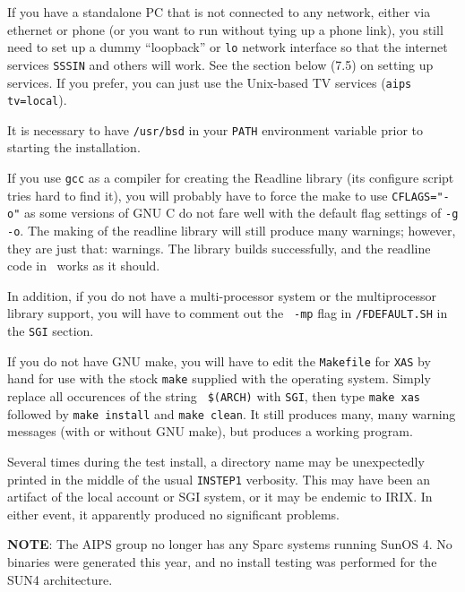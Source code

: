 If you have a standalone PC that is not connected to any network, either
via ethernet or phone (or you want to run without tying up a phone
link), you still need to set up a dummy ``loopback'' or {\tt lo} network
interface so that the internet services {\tt SSSIN} and others will
work.  See the section below
(7.5) on setting up services.  If you prefer, you can just use the
Unix-based TV services ({\tt aips tv=local}).

\medskip{}

It is necessary to have {\tt /usr/bsd} in your {\tt PATH} environment
variable prior to starting the installation.

If you use {\tt gcc} as a compiler for creating the Readline library
(its configure script tries hard to find it), you will probably have to
force the make to use {\tt CFLAGS="-o"} as some versions of GNU C do not
fare well with the default flag settings of {\tt -g -o}.  The making of
the readline library will still produce many warnings; however, they are
just that: warnings.  The library builds successfully, and the readline
code in \ttaips\ works as it should.

In addition, if you do not have a multi-processor system or the
multiprocessor library support, you will have to comment out the {\tt
-mp} flag in {\tt\SYSU /FDEFAULT.SH} in the {\tt SGI} section.

If you do not have GNU make, you will have to edit the {\tt Makefile}
for {\tt XAS} by hand for use with the stock {\tt make} supplied with
the operating system.  Simply replace all occurences of the string {\tt
\$(ARCH)}
with {\tt SGI}, then type {\tt make xas} followed by {\tt make install}
and {\tt make clean}.  It still produces many, many warning messages
(with or without GNU make), but produces a working program.

Several times during the test install, a directory name may be
unexpectedly printed in the middle of the usual {\tt INSTEP1} verbosity.
This may have been an artifact of the local account or SGI system, or it
may be endemic to IRIX.  In either event, it apparently produced no
significant problems.

\medskip{}

{\bf NOTE}: The AIPS group no longer has any Sparc systems running SunOS
4.  No binaries were generated this year, and no install testing was
performed for the SUN4 architecture.

